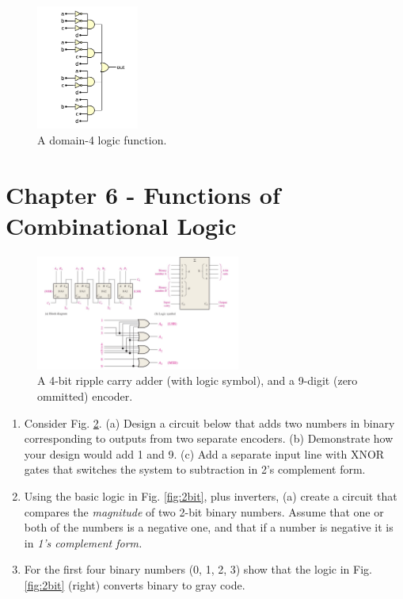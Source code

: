 \documentclass[10pt]{article}
\begin{document}
\begin{figure}[hb]
\centering
\includegraphics[width=0.3\textwidth]{figures/gateExample6.pdf}
\caption{\label{fig:gates1} A domain-4 logic function.}
\end{figure}

\clearpage

\section{Chapter 6 - Functions of Combinational Logic}
\label{sec:comb2}

\begin{figure}[ht]
\centering
\includegraphics[width=0.6\textwidth]{figures/adderEncoder.pdf}
\caption{\label{fig:encadd} A 4-bit ripple carry adder (with logic symbol), and a 9-digit (zero ommitted) encoder.}
\end{figure}

\begin{enumerate}
\item Consider Fig. \ref{fig:encadd}.  (a) Design a circuit below that adds two numbers in binary corresponding to outputs from two separate encoders. (b) Demonstrate how your design would add 1 and 9.  (c) Add a separate input line with XNOR gates that switches the system to subtraction in 2's complement form. \\ \vspace{3cm}
\item Using the basic logic in Fig. \ref{fig:2bit}, plus inverters, (a) create a circuit that compares the \textit{magnitude} of two 2-bit binary numbers.  Assume that one or both of the numbers is a negative one, and that if a number is negative it is in \textit{1's complement form.} \\ \vspace{3cm}
\item For the first four binary numbers (0, 1, 2, 3) show that the logic in Fig. \ref{fig:2bit} (right) converts binary to gray code.
\end{enumerate}
\end{document}
